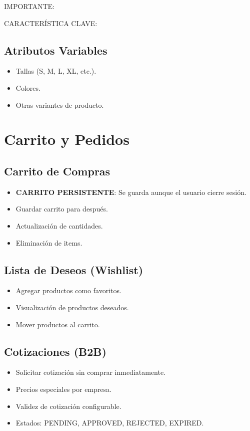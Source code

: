 \documentclass[12pt,a4paper,oneside]{book}
\newcommand{\success}[1]{\textcolor{success}{\textbf{#1}}}
\begin{document}
\begin{alert}{IMPORTANTE:}
\begin{info}{CARACTERÍSTICA CLAVE:}
\subsection{Atributos Variables}
\begin{itemize}
    \item Tallas (S, M, L, XL, etc.).
    \item Colores.
    \item Otras variantes de producto.
\end{itemize}

\section{Carrito y Pedidos}
\label{sec:ventas}

\subsection{Carrito de Compras}
\begin{itemize}
    \item \success{CARRITO PERSISTENTE}: Se guarda aunque el usuario cierre sesión.
    \item Guardar carrito para después.
    \item Actualización de cantidades.
    \item Eliminación de items.
\end{itemize}

\subsection{Lista de Deseos (Wishlist)}
\begin{itemize}
    \item Agregar productos como favoritos.
    \item Visualización de productos deseados.
    \item Mover productos al carrito.
\end{itemize}

\subsection{Cotizaciones (B2B)}
\begin{itemize}
    \item Solicitar cotización sin comprar inmediatamente.
    \item Precios especiales por empresa.
    \item Validez de cotización configurable.
    \item Estados: PENDING, APPROVED, REJECTED, EXPIRED.
\end{itemize}


\end{info}
\end{alert}
\end{document}
